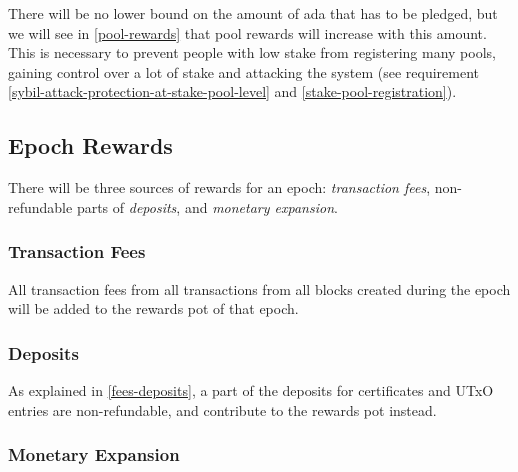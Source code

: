 \documentclass[11pt,a4paper]{article}
\begin{document}
There will be no lower bound on the amount of ada that has to be
pledged, but we will see in \cref{pool-rewards} that pool
rewards will increase with this amount. This is necessary to prevent
people with low stake from registering many pools, gaining control over
a lot of stake and attacking the system (see requirement
\ref{sybil-attack-protection-at-stake-pool-level} and \cref{stake-pool-registration}).

\subsection{Epoch Rewards}
\label{epoch-rewards}

There will be three sources of rewards for an epoch: \emph{transaction
  fees}, non-refundable parts of \emph{deposits}, and \emph{monetary
  expansion}.

\subsubsection{Transaction Fees}
\label{transaction-fees-1}

All transaction fees from all transactions from all blocks created
during the epoch will be added to the rewards pot of that epoch.

\subsubsection{Deposits}
\label{deposits-1}

As explained in \cref{fees-deposits}, a part of the deposits for
certificates and UTxO entries are non-refundable, and contribute to
the rewards pot instead.

\subsubsection{Monetary Expansion}
\label{monetary-expansion}
\end{document}
